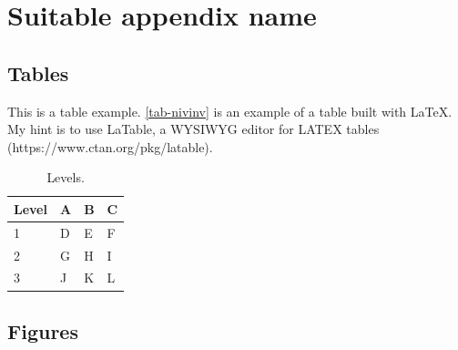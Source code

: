 
 
\chapter{Suitable appendix name}\label{cap_exemplos}


\section{Tables}

This is a table example. \autoref{tab-nivinv} is an example of a table built with \LaTeX. My hint is to use LaTable, a WYSIWYG editor for LATEX tables (https://www.ctan.org/pkg/latable).

\begin{table}[htb]
\footnotesize
\caption[Levels]{Levels.}
\label{tab-nivinv}
\begin{tabular}{p{2.6cm}|p{6.0cm}|p{2.25cm}|p{3.40cm}}
   \hline
   \textbf{Level} & \textbf{A}  & \textbf{B}  & \textbf{C}  \\
    \hline
    1 & D & E & F \\
    \hline
    2 & G & H & I \\
    \hline
    3 & J & K & L \\
   \hline
\end{tabular}
\end{table}


\section{Figures}

